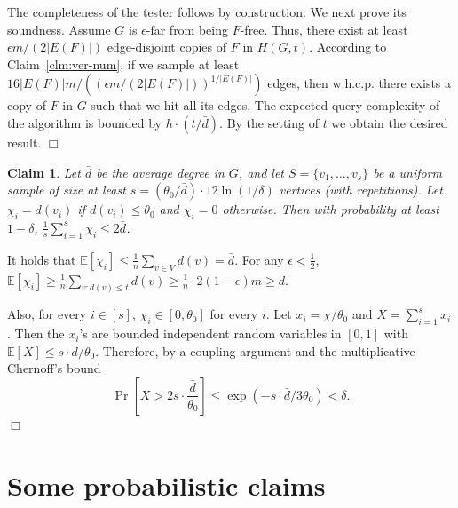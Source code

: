 \documentclass{article}
\newcommand{\eps}{\epsilon}
\newcommand{\Ex}{\mathbb{E}}
\newenvironment{proof}{\smallskip\noindent{\bf Proof:}}%
        {\hspace*{\fill}$\Box$\par}
\newtheorem{claim}[lemma]{Claim}
\begin{document}
\begin{proof}
The completeness of the tester follows by construction.
We next prove its soundness. Assume $G$ is $\epsilon$-far from being $F$-free.
Thus, there exist at least $\epsilon m/ (2|E(F)|)$ edge-disjoint copies of $F$ in $H(G, t)$.
According to Claim~\ref{clm:ver-num}, if we sample at least $16 |E(F)| m / ((\epsilon m/ (2|E(F)|))^{1/|E(F)|})$ edges, then w.h.c.p. there exists a copy of $F$ in $G$ such that we hit all its edges.
The expected query complexity of the algorithm is bounded by $h \cdot (t/\bar{d})$. By the setting of $t$ we obtain the desired result.
\end{proof}
\fi

% 
\begin{claim}\label{clm:average}
	Let $\bar{d}$ be the average degree in $G$, and 
	let $S=\{v_1, \ldots, v_s\}$ be a uniform sample of size at least $s=(\theta_0/\bar{d})\cdot 12\ln(1/\delta)$ vertices (with repetitions).
	Let $\chi_i=d(v_i)$ if $d(v_i)\leq \theta_0$ and $\chi_i=0$ otherwise.
	Then with probability at least $1-\delta$, $\frac{1}{s}\sum_{i=1}^s\chi_i\leq 2\bar{d}$.
\end{claim}

\begin{proof}
	It holds that $\Ex[\chi_i] \leq \frac{1}{n} \sum_{v \in V} d(v) = \bar{d}$.
	For any $\epsilon < \frac{1}{2}$, 
	$\Ex[\chi_i]\geq
	\frac{1}{n}\sum_{v : d(v) \leq t} d(v) 
	\geq \frac{1}{n}\cdot 2(1-\epsilon)m
	\geq \bar{d}$.
	
	Also, for every $i\in [s]$, $\chi_i\in [0,\theta_0]$ for every $i$. 
	Let $x_i=\chi/\theta_0$ and $X=\sum_{i=1}^s x_i$.
	Then the $x_i$'s are bounded independent   random variables in $[0,1]$ with $\Ex[X]\leq s\cdot \bar{d}/\theta_0$. Therefore, by  a coupling argument and the multiplicative Chernoff's bound
	\[
	\Pr\left[X > 2s\cdot \frac{\bar{d}}{\theta_0}\right] \leq  \exp\left( -s\cdot \bar{d}/3\theta_0 \right) < \delta.
	\]
\end{proof}




\section{Some probabilistic claims}\label{app:prob}
\end{document}
